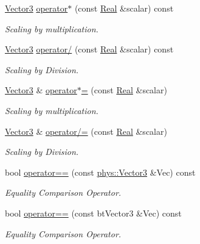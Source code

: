 \begin{DoxyCompactItemize}
\hyperlink{classphys_1_1Vector3}{Vector3} \hyperlink{classphys_1_1Vector3_ab9b40eb9eb73d806434550604e048faa}{operator$\ast$} (const \hyperlink{namespacephys_af7eb897198d265b8e868f45240230d5f}{Real} \&scalar) const 
\begin{DoxyCompactList}\small\item\em Scaling by multiplication. \item\end{DoxyCompactList}\item 
\hyperlink{classphys_1_1Vector3}{Vector3} \hyperlink{classphys_1_1Vector3_a4bb5377ad78c299b40a8bc9fb66a902f}{operator/} (const \hyperlink{namespacephys_af7eb897198d265b8e868f45240230d5f}{Real} \&scalar) const 
\begin{DoxyCompactList}\small\item\em Scaling by Division. \item\end{DoxyCompactList}\item 
\hyperlink{classphys_1_1Vector3}{Vector3} \& \hyperlink{classphys_1_1Vector3_a9dfb27e2ce041ce6141df76438960af0}{operator$\ast$=} (const \hyperlink{namespacephys_af7eb897198d265b8e868f45240230d5f}{Real} \&scalar)
\begin{DoxyCompactList}\small\item\em Scaling by multiplication. \item\end{DoxyCompactList}\item 
\hyperlink{classphys_1_1Vector3}{Vector3} \& \hyperlink{classphys_1_1Vector3_abf6d1850c3ce246a0d8b038f0f5ec46c}{operator/=} (const \hyperlink{namespacephys_af7eb897198d265b8e868f45240230d5f}{Real} \&scalar)
\begin{DoxyCompactList}\small\item\em Scaling by Division. \item\end{DoxyCompactList}\item 
bool \hyperlink{classphys_1_1Vector3_a009087c59c69f69be76ba84ad90b1468}{operator==} (const \hyperlink{classphys_1_1Vector3}{phys::Vector3} \&Vec) const 
\begin{DoxyCompactList}\small\item\em Equality Comparison Operator. \item\end{DoxyCompactList}\item 
bool \hyperlink{classphys_1_1Vector3_a87076a2c336aedef5642ff1cc9fe0cad}{operator==} (const btVector3 \&Vec) const 
\begin{DoxyCompactList}\small\item\em Equality Comparison Operator. \item\end{DoxyCompactList}\item 

\end{DoxyCompactItemize}
